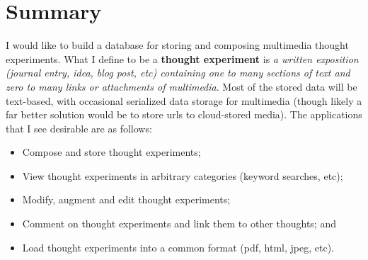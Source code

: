 \section{Summary}
I would like to build a database for storing and composing multimedia thought experiments.  What I define to be a \textbf{thought experiment} is \emph{a written exposition (journal entry, idea, blog post, etc) containing one to many sections of text and zero to many links or attachments of multimedia}.  Most of the stored data will be text-based, with occasional serialized data storage for multimedia (though likely a far better solution would be to store urls to cloud-stored media).  The applications that I see desirable are as follows: 
\begin{itemize}
\item Compose and store thought experiments; 
\item View thought experiments in arbitrary categories (keyword searches, etc); 
\item Modify, augment and edit thought experiments; 
\item Comment on thought experiments and link them to other thoughts; and 
\item Load thought experiments into a common format (pdf, html, jpeg, etc).
\end{itemize}
